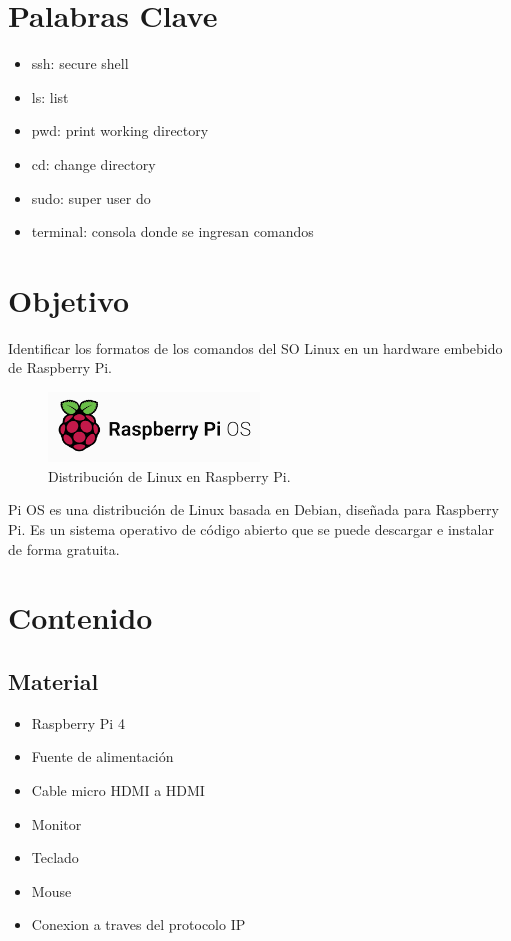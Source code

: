 \documentclass[12pt]{report}
\begin{document}
\tableofcontents
\newpage

\chapter*{Palabras Clave}
\begin{itemize}
  \item ssh: secure shell
  \item ls: list
  \item pwd: print working directory
  \item cd: change directory
  \item sudo: super user do
  \item terminal: consola donde se ingresan comandos
\end{itemize}
\newpage

\chapter*{Objetivo}
Identificar los formatos de los comandos del SO Linux en un hardware embebido de Raspberry Pi.
\begin{figure}[H]
  \centering
  \includegraphics[width=0.5\textwidth]{Screenshots/piOS.png}
  \caption{Distribución de Linux en Raspberry Pi.}
  \label{fig:piOS}
\end{figure}
Pi OS es una distribución de Linux basada en Debian, diseñada para Raspberry Pi. Es un sistema operativo de código abierto que se puede descargar e instalar de forma gratuita.
\newpage

\chapter{Contenido}
\section{Material}
\begin{itemize}
  \item Raspberry Pi 4
  \item Fuente de alimentación
  \item Cable micro HDMI a HDMI
  \item Monitor
  \item Teclado
  \item Mouse
  \item Conexion a traves del protocolo IP
\end{itemize}
\end{document}

